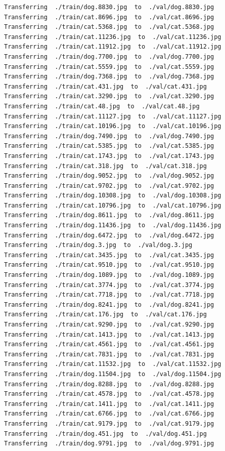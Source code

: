 \documentclass[]{book}
\theoremstyle{definition}
\theoremstyle{definition}
\theoremstyle{definition}
\theoremstyle{remark}
\begin{document}
\begin{verbatim}
Transferring  ./train/dog.8830.jpg  to  ./val/dog.8830.jpg
Transferring  ./train/cat.8696.jpg  to  ./val/cat.8696.jpg
Transferring  ./train/cat.5368.jpg  to  ./val/cat.5368.jpg
Transferring  ./train/cat.11236.jpg  to  ./val/cat.11236.jpg
Transferring  ./train/cat.11912.jpg  to  ./val/cat.11912.jpg
Transferring  ./train/dog.7700.jpg  to  ./val/dog.7700.jpg
Transferring  ./train/cat.5559.jpg  to  ./val/cat.5559.jpg
Transferring  ./train/dog.7368.jpg  to  ./val/dog.7368.jpg
Transferring  ./train/cat.431.jpg  to  ./val/cat.431.jpg
Transferring  ./train/cat.3290.jpg  to  ./val/cat.3290.jpg
Transferring  ./train/cat.48.jpg  to  ./val/cat.48.jpg
Transferring  ./train/cat.11127.jpg  to  ./val/cat.11127.jpg
Transferring  ./train/cat.10196.jpg  to  ./val/cat.10196.jpg
Transferring  ./train/dog.7490.jpg  to  ./val/dog.7490.jpg
Transferring  ./train/cat.5385.jpg  to  ./val/cat.5385.jpg
Transferring  ./train/cat.1743.jpg  to  ./val/cat.1743.jpg
Transferring  ./train/cat.318.jpg  to  ./val/cat.318.jpg
Transferring  ./train/dog.9052.jpg  to  ./val/dog.9052.jpg
Transferring  ./train/cat.9702.jpg  to  ./val/cat.9702.jpg
Transferring  ./train/dog.10308.jpg  to  ./val/dog.10308.jpg
Transferring  ./train/cat.10796.jpg  to  ./val/cat.10796.jpg
Transferring  ./train/dog.8611.jpg  to  ./val/dog.8611.jpg
Transferring  ./train/dog.11436.jpg  to  ./val/dog.11436.jpg
Transferring  ./train/dog.6472.jpg  to  ./val/dog.6472.jpg
Transferring  ./train/dog.3.jpg  to  ./val/dog.3.jpg
Transferring  ./train/cat.3435.jpg  to  ./val/cat.3435.jpg
Transferring  ./train/cat.9510.jpg  to  ./val/cat.9510.jpg
Transferring  ./train/dog.1089.jpg  to  ./val/dog.1089.jpg
Transferring  ./train/cat.3774.jpg  to  ./val/cat.3774.jpg
Transferring  ./train/cat.7718.jpg  to  ./val/cat.7718.jpg
Transferring  ./train/dog.8241.jpg  to  ./val/dog.8241.jpg
Transferring  ./train/cat.176.jpg  to  ./val/cat.176.jpg
Transferring  ./train/cat.9290.jpg  to  ./val/cat.9290.jpg
Transferring  ./train/cat.1413.jpg  to  ./val/cat.1413.jpg
Transferring  ./train/cat.4561.jpg  to  ./val/cat.4561.jpg
Transferring  ./train/cat.7831.jpg  to  ./val/cat.7831.jpg
Transferring  ./train/cat.11532.jpg  to  ./val/cat.11532.jpg
Transferring  ./train/dog.11504.jpg  to  ./val/dog.11504.jpg
Transferring  ./train/dog.8288.jpg  to  ./val/dog.8288.jpg
Transferring  ./train/cat.4578.jpg  to  ./val/cat.4578.jpg
Transferring  ./train/cat.1411.jpg  to  ./val/cat.1411.jpg
Transferring  ./train/cat.6766.jpg  to  ./val/cat.6766.jpg
Transferring  ./train/cat.9179.jpg  to  ./val/cat.9179.jpg
Transferring  ./train/dog.451.jpg  to  ./val/dog.451.jpg
Transferring  ./train/dog.9791.jpg  to  ./val/dog.9791.jpg

\end{verbatim}
\end{document}
